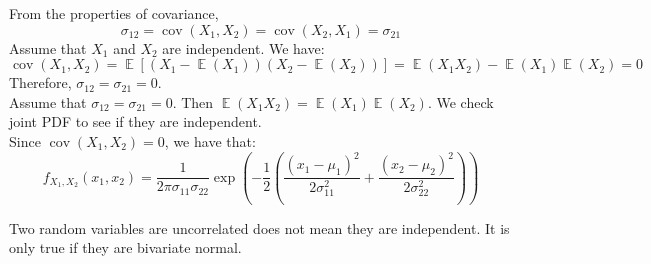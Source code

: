 \documentclass{huhtakm-template-book-v2}
\DeclareMathOperator{\E}{\mathbb{E}}
\DeclareMathOperator{\cov}{cov}
\begin{document}
\begin{proofing}
	From the properties of covariance,
	\begin{equation*}
		\sigma_{12}=\cov(X_{1},X_{2})=\cov(X_{2},X_{1})=\sigma_{21}
	\end{equation*}
	Assume that $X_{1}$ and $X_{2}$ are independent. We have:
	\begin{equation*}
		\cov(X_{1},X_{2})=\E[(X_{1}-\E(X_{1}))(X_{2}-\E(X_{2}))]=\E(X_{1}X_{2})-\E(X_{1})\E(X_{2})=0
	\end{equation*}
	Therefore, $\sigma_{12}=\sigma_{21}=0$.\\
	Assume that $\sigma_{12}=\sigma_{21}=0$. Then $\E(X_{1}X_{2})=\E(X_{1})\E(X_{2})$. We check joint PDF to see if they are independent.\\
	Since $\cov(X_{1},X_{2})=0$, we have that:
	\begin{equation*}
		f_{X_{1},X_{2}}(x_{1},x_{2})=\frac{1}{2\pi\sigma_{11}\sigma_{22}}\exp\left(-\frac{1}{2}\left(\frac{(x_{1}-\mu_{1})^{2}}{2\sigma_{11}^{2}}+\frac{(x_{2}-\mu_{2})^{2}}{2\sigma_{22}^{2}}\right)\right)
	\end{equation*}
\end{proofing}
\begin{rem}
	Two random variables are uncorrelated does not mean they are independent. It is only true if they are bivariate normal.
\end{rem}
\end{document}
